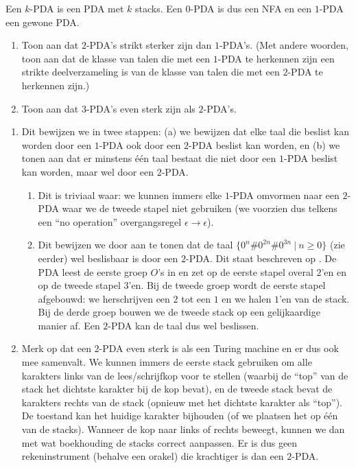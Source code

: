\documentclass[a4paper]{article}
\begin{document}
\begin{question}
Een $k$-PDA is een PDA met $k$ stacks. Een $0$-PDA is dus een NFA en een $1$-PDA een gewone PDA. 
\begin{enumerate}
  \item Toon aan dat $2$-PDA's strikt sterker zijn dan $1$-PDA's. (Met andere woorden, toon aan dat de klasse van talen die met een $1$-PDA te herkennen zijn een strikte deelverzameling is van de klasse van talen die met een $2$-PDA te herkennen zijn.)
  \item Toon aan dat $3$-PDA's even sterk zijn als $2$-PDA's.
\end{enumerate}
\end{question}
\begin{answer}
\begin{enumerate}
\item Dit bewijzen we in twee stappen: (a) we bewijzen dat elke taal die beslist kan worden door een $1$-PDA ook door een $2$-PDA beslist kan worden, en (b) we tonen aan dat er minstens \'e\'en taal bestaat die niet door een $1$-PDA beslist kan worden, maar wel door een $2$-PDA.
\begin{enumerate}
 \item Dit is triviaal waar: we kunnen immers elke $1$-PDA omvormen naar een $2$-PDA waar we de tweede stapel niet gebruiken (we voorzien dus telkens een ``no operation'' overgangsregel $\epsilon\rightarrow\epsilon$).
 \item Dit bewijzen we door aan te tonen dat de taal $\{ 0^n\#0^{2n}\#0^{3n} \ | \ n \geq 0 \}$ (zie eerder) wel beslisbaar is door een $2$-PDA. Dit staat beschreven op \figref{}. De PDA leest de eerste groep $O$'s in en zet op de eerste stapel overal $2$'en en op de tweede stapel $3$'en. Bij de tweede groep wordt de eerste stapel afgebouwd: we herschrijven een $2$ tot een $1$ en we halen $1$'en van de stack. Bij de derde groep bouwen we de tweede stack op een gelijkaardige manier af. Een $2$-PDA kan de taal dus wel beslissen.
\end{enumerate}
\item 
\begin{note}
Merk op dat een $2$-PDA even sterk is als een Turing machine en er dus ook mee samenvalt. We kunnen immers de eerste stack gebruiken om alle karakters links van de lees/schrijfkop voor te stellen (waarbij de ``top'' van de stack het dichtste karakter bij de kop bevat), en de tweede stack bevat de karakters rechts van de stack (opnieuw met het dichtste karakter als ``top''). De toestand kan het huidige karakter bijhouden (of we plaatsen het op \'e\'en van de stacks). Wanneer de kop naar links of rechts beweegt, kunnen we dan met wat boekhouding de stacks correct aanpassen. Er is dus geen rekeninstrument (behalve een orakel) die krachtiger is dan een $2$-PDA.
\end{note}
\end{enumerate}
\end{answer}
\end{document}
